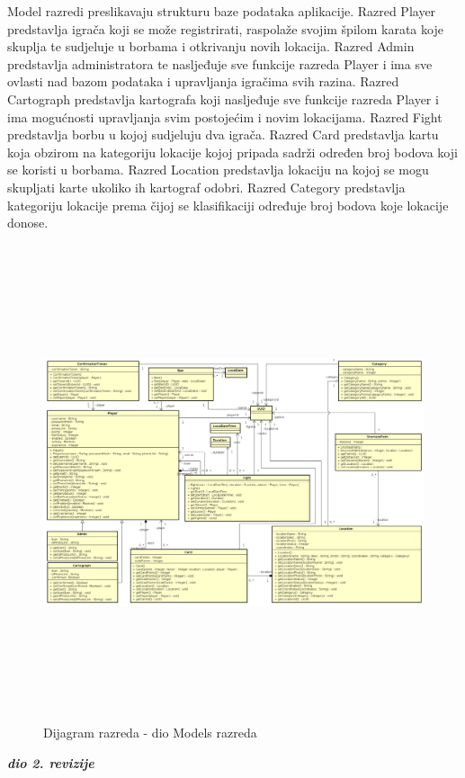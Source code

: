 			{Model razredi preslikavaju strukturu baze podataka aplikacije. Razred Player predstavlja igrača koji se može registrirati, raspolaže svojim špilom karata koje skuplja te sudjeluje u borbama i otkrivanju novih lokacija. Razred Admin predstavlja administratora te nasljeđuje sve funkcije razreda Player i ima sve ovlasti nad bazom podataka i upravljanja igračima svih razina. Razred Cartograph predstavlja kartografa koji nasljeđuje sve funkcije razreda Player i ima mogućnosti upravljanja svim postojećim i novim lokacijama. Razred Fight predstavlja borbu u kojoj sudjeluju dva igrača. Razred Card predstavlja kartu koja obzirom na kategoriju lokacije kojoj pripada sadrži određen broj bodova koji se koristi u borbama. Razred Location predstavlja lokaciju na kojoj se mogu skupljati karte ukoliko ih kartograf odobri. Razred Category predstavlja kategoriju lokacije prema čijoj se klasifikaciji određuje broj bodova koje lokacije donose.}
			
			\begin{figure}[H]
				\includegraphics[width=\linewidth, height=14cm]{dijagrami/modelclass_diagram}				
				\centering
				\caption{Dijagram razreda - dio Models razreda}
				\label{}
			\end{figure}
			
			\textbf{\textit{dio 2. revizije}}\\			
			
